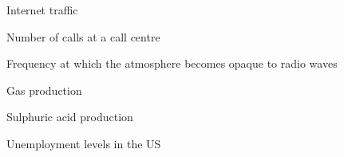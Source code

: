 \begin{figure}
  \caption[Internet traffic]{Internet traffic}
\end{figure}


\begin{figure}
  \caption[Number of calls at a call centre]{Number of calls at a call centre}
\end{figure}


\begin{figure}
  \caption[Frequency at which the atmosphere becomes opaque to radio waves]{Frequency at which the atmosphere becomes opaque to radio waves}
\end{figure}


\begin{figure}
  \caption[Gas production]{Gas production}
\end{figure}


\begin{figure}
  \caption[Sulphuric acid production]{Sulphuric acid production}
\end{figure}


\begin{figure}
  \caption[Unemployment levels in the US]{Unemployment levels in the US}
\end{figure}

